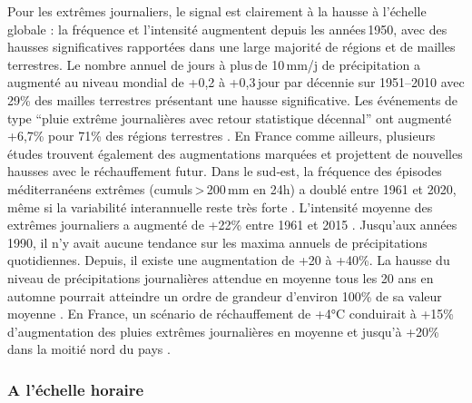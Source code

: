 \documentclass[
  article,
  nofooter,
  noheadings]{jss}
\begin{document}
Pour les extrêmes journaliers, le signal est clairement à la hausse à
l'échelle globale : la fréquence et l'intensité augmentent depuis les
années\,1950, avec des hausses significatives rapportées dans une large
majorité de régions et de mailles terrestres. Le nombre annuel de jours
à plus\,de 10\,mm/j de précipitation a augmenté au niveau mondial de
+0,2 à +0,3\,jour par décennie sur 1951--2010 \citep{Donat2013} avec
29\% des mailles terrestres présentant une hausse significative. Les
événements de type ``pluie extrême journalières avec retour statistique
décennal'' ont augmenté +6,7\% pour 71\% des régions terrestres
\citep{IPCC2021}. En France comme ailleurs, plusieurs études trouvent
également des augmentations marquées et projettent de nouvelles hausses
avec le réchauffement futur. Dans le sud‑est, la fréquence des épisodes
méditerranéens extrêmes (cumuls\,\textgreater\,200\,mm en 24h) a doublé
entre 1961 et 2020, même si la variabilité interannuelle reste très
forte \citep{meteofrance2024_episodesMediterraneens}. L'intensité
moyenne des extrêmes journaliers a augmenté de +22\% entre 1961 et 2015
\citep{Ribes2019}. Jusqu'aux années 1990, il n'y avait aucune tendance
sur les maxima annuels de précipitations quotidiennes. Depuis, il existe
une augmentation de +20 à +40\%. La hausse du niveau de précipitations
journalières attendue en moyenne tous les 20 ans en automne pourrait
atteindre un ordre de grandeur d'environ 100\% de sa valeur moyenne
\citep{blanchet2021explaining}. En France, un scénario de réchauffement
de +4°C conduirait à +15\% d'augmentation des pluies extrêmes
journalières en moyenne et jusqu'à +20\% dans la moitié nord du pays
\citep{soubeyroux:hal-04991790}.

\subsubsection{A l'échelle horaire}\label{a-luxe9chelle-horaire}
\end{document}
